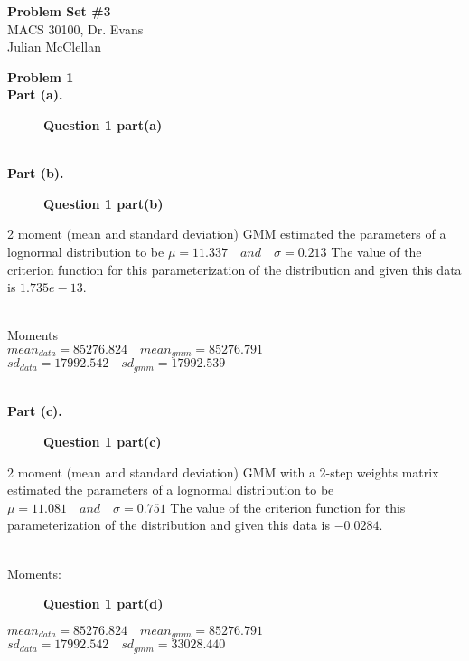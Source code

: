 \documentclass[letterpaper,12pt]{article}
\theoremstyle{definition}
\begin{document}
\begin{flushleft}
  \textbf{\large{Problem Set \#3}} \\
  MACS 30100, Dr. Evans \\
  Julian McClellan
\end{flushleft}

\vspace{5mm}

\noindent\textbf{Problem 1} 
\\
\noindent\textbf{Part (a).} 
\begin{figure}[htb]\centering\captionsetup{width=4.0in}
  \caption{\textbf{Question 1 part(a)}}\label{Figure 1a}
\end{figure}

\\
\noindent\textbf{Part (b).} 
\begin{figure}[H]\centering\captionsetup{width=4.0in}
  \caption{\textbf{Question 1 part(b)}}\label{Figure 1b}
\end{figure}
2 moment (mean and standard deviation) GMM estimated the parameters of a lognormal distribution to be $\mu=11.337\quad and \quad \sigma=0.213$
The value of the criterion function for this parameterization of the distribution
and given this data is $1.735e-13$.

\\
Moments\\
$mean_{data}=85276.824\quad mean_{gmm}=85276.791$
$sd_{data}=17992.542\quad sd_{gmm}=17992.539$

\\
\noindent\textbf{Part (c).}
\begin{figure}[H]\centering\captionsetup{width=4.0in}
  \caption{\textbf{Question 1 part(c)}}\label{Figure 1c}
\end{figure}
2 moment (mean and standard deviation) GMM with a 2-step weights matrix estimated the parameters of a lognormal distribution to be $\mu=11.081\quad and \quad \sigma=0.751$
The value of the criterion function for this parameterization of the distribution
and given this data is $-0.0284$.

\\
Moments:\\
\begin{figure}[H]\centering\captionsetup{width=4.0in}
  \caption{\textbf{Question 1 part(d)}}\label{Figure 1d}
\end{figure}
$mean_{data}=85276.824\quad mean_{gmm}=85276.791$
$sd_{data}=17992.542\quad sd_{gmm}=33028.440$
\end{document}
